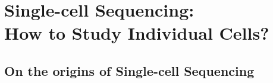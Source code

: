 
\section[Single-cell \glsentryshort{rna} Sequencing: How to Study Individual Cells?]{Single-cell  Sequencing:\\How to Study Individual Cells?}  %
\label{sec:int_scrna}




\subsection[On the origins of \glsentryshort{scr}]{On the origins of Single-cell  Sequencing}
\label{sec:int_scrna_intro}


